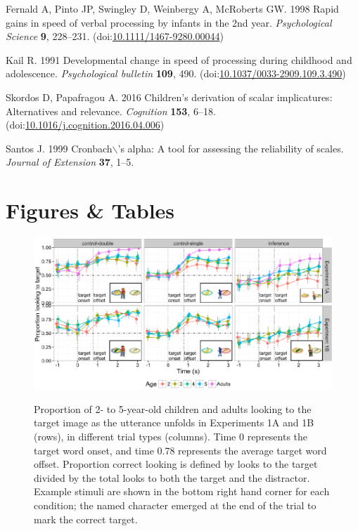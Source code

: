 \documentclass{rsos}
\begin{document}
\begin{thebibliography}{10}
\hypertarget{ref-fernald1998}{}
 Fernald A, Pinto JP, Swingley D, Weinbergy A, McRoberts GW. 1998
Rapid gains in speed of verbal processing by infants in the 2nd year.
\emph{Psychological Science} \textbf{9}, 228--231.
(doi:\href{https://doi.org/10.1111/1467-9280.00044}{10.1111/1467-9280.00044})

\hypertarget{ref-kail1991}{}
 Kail R. 1991 Developmental change in speed of processing during
childhood and adolescence. \emph{Psychological bulletin} \textbf{109},
490.
(doi:\href{https://doi.org/10.1037/0033-2909.109.3.490}{10.1037/0033-2909.109.3.490})

\hypertarget{ref-skordos2016}{}
 Skordos D, Papafragou A. 2016 Children's derivation of scalar
implicatures: Alternatives and relevance. \emph{Cognition} \textbf{153},
6--18.
(doi:\href{https://doi.org/10.1016/j.cognition.2016.04.006}{10.1016/j.cognition.2016.04.006})

\hypertarget{ref-santos1999cronbach}{}
 Santos J. 1999 Cronbach\(\backslash\)'s alpha: A tool for assessing
the reliability of scales. \emph{Journal of Extension} \textbf{37},
1--5.

\end{thebibliography}

\newpage

\section*{Figures \& Tables}

\begin{figure}[!h]
{\centering \includegraphics[width=5.5in]{figs/et_accuracy-1} 
}

\caption[Proportion of 2- to 5-year-old children and adults looking to the target image as the utterance unfolds in Experiments 1A and 1B (rows), in different trial types (columns)]{Proportion of 2- to 5-year-old children and adults looking to the target image as the utterance unfolds in Experiments 1A and 1B (rows), in different trial types (columns). Time 0 represents the target word onset, and time 0.78 represents the average target word offset. Proportion correct looking is defined by looks to the target divided by the total looks to both the target and the distractor. Example stimuli are shown in the bottom right hand corner for each condition; the named character emerged at the end of the trial to mark the correct target.}\label{fig:et_accuracy}
\end{figure}
\end{document}
